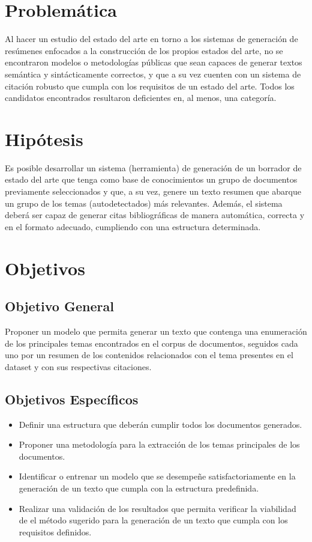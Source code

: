 \section{Problemática}
    Al hacer un estudio del estado del arte en torno a los sistemas de generación de resúmenes enfocados a la construcción de los propios estados del arte, no se encontraron modelos o metodologías públicas que sean capaces de generar textos semántica y sintácticamente correctos, y que a su vez cuenten con un sistema de citación robusto que cumpla con los requisitos de un estado del arte. Todos los candidatos encontrados resultaron deficientes en, al menos, una categoría.

\section{Hipótesis}
    Es posible desarrollar un sistema (herramienta) de generación de un borrador de estado del arte que tenga como base de conocimientos un grupo de documentos previamente seleccionados y que, a su vez, genere un texto resumen que abarque un grupo de los temas (autodetectados) más relevantes. Además, el sistema deberá ser capaz de generar citas bibliográficas de manera automática, correcta y en el formato adecuado, cumpliendo con una estructura determinada.

\section{Objetivos}
    \subsection{Objetivo General}

        Proponer un modelo que permita generar un texto que contenga una enumeración de los principales temas encontrados en el corpus de documentos, seguidos cada uno por un resumen de los contenidos relacionados con el tema presentes en el dataset y con sus respectivas citaciones.

    \subsection{Objetivos Específicos}

        \begin{itemize}
            \item Definir una estructura que deberán cumplir todos los documentos generados.
            \item Proponer una metodología para la extracción de los temas principales de los documentos.
            \item Identificar o entrenar un modelo que se desempeñe satisfactoriamente en la generación de un texto que cumpla con la estructura predefinida.
            \item Realizar una validación de los resultados que permita verificar la viabilidad de el método sugerido para la generación de un texto que cumpla con los requisitos definidos.
        \end{itemize}
